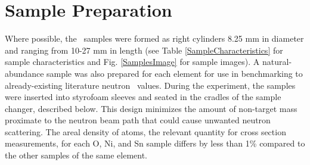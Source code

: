 \section{Sample Preparation}
Where possible, the \tot\ samples were formed as right
cylinders 8.25 mm in diameter and ranging from 10-27 mm in length (see
Table \ref{SampleCharacteristics} for sample characteristics and Fig. \ref{SamplesImage}
for sample images). A natural-abundance sample
was also prepared for each element for use in benchmarking to already-existing
literature neutron \tot\ values. During the experiment, the samples were inserted
into styrofoam sleeves and seated in the cradles of the sample
changer, described below. This design minimizes the amount of non-target mass proximate to the
neutron beam path that could cause unwanted neutron scattering. The areal density of atoms,
the relevant quantity for cross section measurements, for each O, Ni, and Sn sample differs by less 
than 1\% compared to the other samples of the same element.
